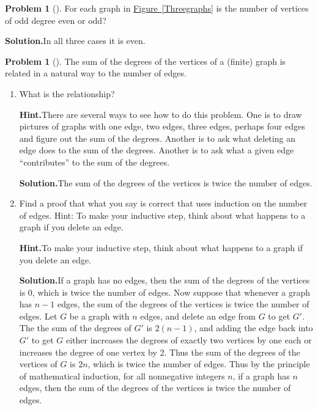 \documentclass[10pt,]{book}
\theoremstyle{plain}
\theoremstyle{definition}
\newtheorem{activity}[project]{Problem}
\theoremstyle{definition}
\numberwithin{equation}{chapter}
\begin{document}
\begin{activity}[]\label{activity-101}
For each graph in \hyperref[Threegraphs]{Figure~\ref{Threegraphs}} is the number of vertices of odd degree even or odd?%
\par\medskip\noindent%
\textbf{Solution.}\quad In all three cases it is even.%
\end{activity}
\begin{activity}[]\label{activity-102}
The sum of the degrees of the vertices of a (finite) graph is related in a natural way to the number of edges.%
\begin{enumerate}[font=\bfseries,label=(\alph*),ref=\alph*]
\item\label{task-87} What is the relationship?%
\par\medskip\noindent%
\textbf{Hint.}\quad There are several ways to see how to do this problem. One is to draw pictures of graphs with one edge, two edges, three edges, perhaps four edges and figure out the sum of the degrees. Another is to ask what deleting an edge does to the sum of the degrees. Another is to ask what a given edge ``contributes'' to the sum of the degrees.%
\par\medskip\noindent%
\textbf{Solution.}\quad The sum of the degrees of the vertices is twice the number of edges.%
\item\label{task-88} Find a proof that what you say is correct that uses induction on the number of edges.  Hint:  To make your inductive step, think about what happens to a graph if you delete an edge.%
\par\medskip\noindent%
\textbf{Hint.}\quad To make your inductive step, think about what happens to a graph if you delete an edge.%
\par\medskip\noindent%
\textbf{Solution.}\quad If a graph has no edges, then the sum of the degrees of the vertices is 0, which is twice the number of edges. Now suppose that whenever a graph has \(n-1\) edges, the sum of the degrees of the vertices is twice the number of edges. Let \(G\) be a graph with \(n\) edges, and delete an edge from \(G\) to get \(G'\). The the sum of the degrees of \(G'\) is \(2(n-1)\), and adding the edge back into \(G'\) to get \(G\) either increases the degrees of exactly two vertices by one each or increases the degree of one vertex by 2. Thus the sum of the degrees of the vertices of \(G\) is \(2n\), which is twice the number of edges. Thus by the principle of mathematical induction, for all nonnegative integers \(n\), if a graph has \(n\) edges, then the sum of the degrees of the vertices is twice the number of edges.%

\end{enumerate}
\end{activity}
\end{document}
